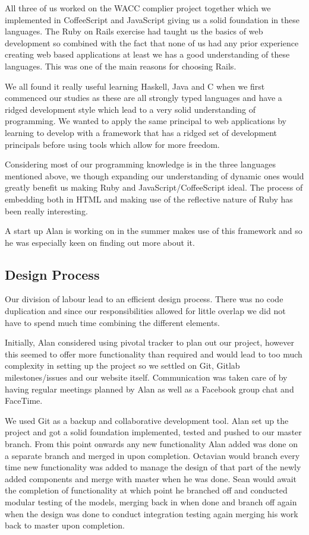 \documentclass[a4wide, 11pt]{article}
\begin{document}
All three of us worked on the WACC complier project together which we implemented in CoffeeScript and JavaScript giving us a solid foundation in these languages. The Ruby on Rails exercise had taught us the basics of web development so combined with the fact that none of us had any prior experience creating web based applications at least we has a good understanding of these languages. This was one of the main reasons for choosing Rails. 

We all found it really useful learning Haskell, Java and C when we first commenced our studies as these are all strongly typed languages and have a ridged development style which lead to a very solid understanding of programming. We wanted to apply the same principal to web applications by learning to develop with a framework that has a ridged set of development principals before using tools which allow for more freedom. 

Considering most of our programming knowledge is in the three languages mentioned above, we though expanding our understanding of dynamic ones would greatly benefit us making Ruby and JavaScript/CoffeeScript ideal. The process of embedding both in HTML and making use of the reflective nature of Ruby has been really interesting.

A start up Alan is working on in the summer makes use of this framework and so he was especially keen on finding out more about it. 

\subsection{Design Process}
Our division of labour lead to an efficient design process. There was no code duplication and since our responsibilities allowed for little overlap we did not have to spend much time combining the different elements. 

Initially, Alan considered using pivotal tracker to plan out our project, however this seemed to offer more functionality than required and would lead to too much complexity in setting up the project so we settled on Git, Gitlab milestones/issues and our website itself. Communication was taken care of by having regular meetings planned by Alan as well as a Facebook group chat and FaceTime. 

We used Git as a backup and collaborative development tool. Alan set up the project and got a solid foundation implemented, tested and pushed to our master branch. 
From this point onwards any new functionality Alan added was done on a separate branch and merged in upon completion. 
Octavian would branch every time new functionality was added to manage the design of that part of the newly added components and merge with master when he was done. 
Sean would await the completion of functionality at which point he branched off and conducted modular testing of the models, merging back in when done and branch off again when the design was done to conduct integration testing again merging his work back to master upon completion. 
\end{document}
